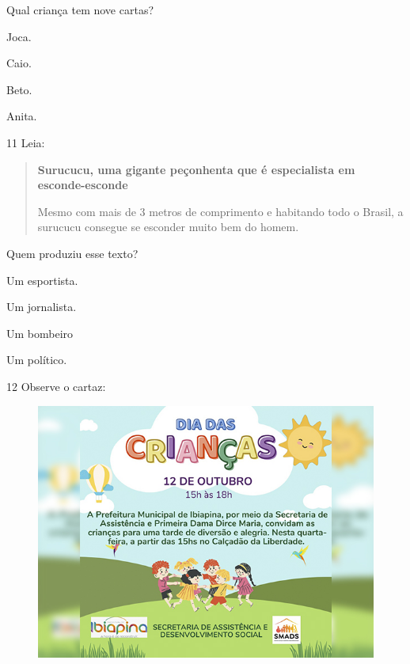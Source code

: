Qual criança tem nove cartas?

\begin{escolha}
\item Joca.

\item Caio.

\item Beto.

\item Anita.
\end{escolha}

\num{11} Leia:

\begin{quote}
\textbf{Surucucu, uma gigante peçonhenta que é especialista em esconde-esconde}

Mesmo com mais de 3 metros de comprimento e habitando todo o Brasil, a
surucucu consegue se esconder muito bem do homem.
\end{quote}


Quem produziu esse texto?

\begin{escolha}
\item Um esportista.

\item Um jornalista.

\item Um bombeiro

\item Um político.
\end{escolha}

\num{12} Observe o cartaz:

\begin{figure}[htpb!]
\centering
\includegraphics[width=.5\textwidth]{media/image181.jpeg}
\end{figure}



